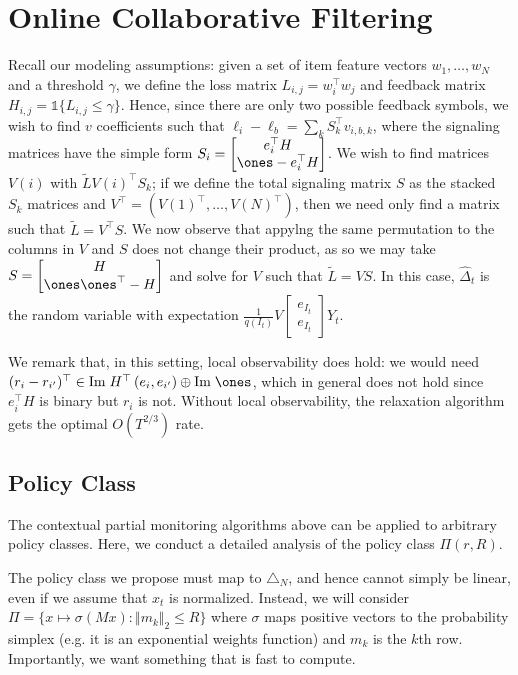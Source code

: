 \documentclass[11pt]{article}
\newcommand{\im}{{\mathrm{Im}\;}}
\begin{document}
\section{Online Collaborative Filtering}
Recall our modeling assumptions: given a set of item feature vectors $w_1,\ldots,w_N$ and a threshold $\gamma$, we define the loss matrix $L_{i,j} = w_i^\top w_j$ and feedback matrix $H_{i,j} = \mathds{1}\{L_{i,j} \leq \gamma\}$. Hence, since there are only two possible feedback symbols, we wish to find $v$ coefficients such that $\ell_i - \ell_b = \sum_k S_k^\top v_{i,b,k}$, where the signaling matrices have the simple form
$
  S_i =
  \begin{bmatrix}
    e_i^\top H\\
    \ones- e_i^\top H
  \end{bmatrix}
  $.
  We wish to find matrices $V(i)$ with $\tilde L V(i)^\top S_k$; if we define the total signaling matrix $S$ as the stacked $S_k$ matrices and $V^\top = (V(1)^\top,\ldots,V(N)^\top)$, then we need only find a matrix such that $\tilde L = V^\top S$. We now observe that appylng the same permutation to the columns in $V$ and $S$ does not change their product, as so we may take $S=
  \begin{bmatrix}
    H\\
    \ones \ones^\top - H
  \end{bmatrix}$
  and solve for $V$ such that $\tilde L = V S$. In this case, $\hat\Delta_t$ is the random variable with expectation $\frac{1}{q(I_t)}V \begin{bmatrix}
 e_{I_t}\\e_{I_t} 
\end{bmatrix}
Y_t$.

We remark that, in this setting, local observability does hold: we would need $(r_i - r_{i'})^\top \in \im H^\top\left(e_i, e_{i'}\right) \oplus \im \ones$, which in general does not hold since $e_i^\top H$ is binary but $r_i$ is not. Without local observability, the relaxation algorithm gets the optimal $O(T^{2/3})$ rate. 


\subsection{Policy Class}
The contextual partial monitoring algorithms above can be applied to arbitrary policy classes. Here, we conduct a detailed analysis of the policy class $\Pi(r,R)$.

The policy class we propose must map to $\triangle_N$, and hence cannot simply be linear, even if we assume that $x_t$ is normalized. Instead, we will consider $\Pi = \{ x\mapsto \sigma(M x) : \Vert m_k \Vert_2 \leq R\}$ where $\sigma$ maps positive vectors to the probability simplex (e.g. it is an exponential weights function) and $m_k$ is the $k$th row. Importantly, we want something that is fast to compute.
\end{document}

